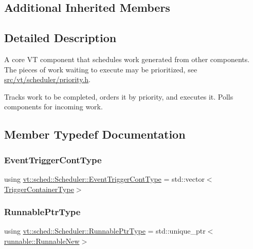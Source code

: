 \subsection*{Additional Inherited Members}


\subsection{Detailed Description}
A core VT component that schedules work generated from other components. The pieces of work waiting to execute may be prioritized, see \hyperlink{priority_8h}{src/vt/scheduler/priority.\+h}. 

Tracks work to be completed, orders it by priority, and executes it. Polls components for incoming work. 

\subsection{Member Typedef Documentation}
\mbox{\label{structvt_1_1sched_1_1_scheduler_a68203230dc48285d3d50bbb363ed267b}} 
\subsubsection{\texorpdfstring{Event\+Trigger\+Cont\+Type}{EventTriggerContType}}
{\footnotesize\ttfamily using \hyperlink{structvt_1_1sched_1_1_scheduler_a68203230dc48285d3d50bbb363ed267b}{vt\+::sched\+::\+Scheduler\+::\+Event\+Trigger\+Cont\+Type} =  std\+::vector$<$\hyperlink{structvt_1_1sched_1_1_scheduler_a0b9fe2a5ee31ca84fa52764a126ad666}{Trigger\+Container\+Type}$>$}

\mbox{\label{structvt_1_1sched_1_1_scheduler_a0bc4ead96e12a5c516afebc8b1cb0b79}} 
\subsubsection{\texorpdfstring{Runnable\+Ptr\+Type}{RunnablePtrType}}
{\footnotesize\ttfamily using \hyperlink{structvt_1_1sched_1_1_scheduler_a0bc4ead96e12a5c516afebc8b1cb0b79}{vt\+::sched\+::\+Scheduler\+::\+Runnable\+Ptr\+Type} =  std\+::unique\+\_\+ptr$<$\hyperlink{structvt_1_1runnable_1_1_runnable_new}{runnable\+::\+Runnable\+New}$>$}

